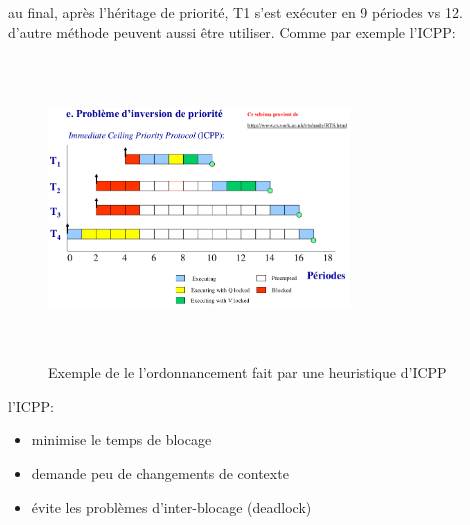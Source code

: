 \documentclass[oneside]{book}
\begin{document}
    au final, après l'héritage de priorité, T1 s'est exécuter en 9 périodes vs 12.\\
    
    d'autre méthode peuvent aussi être utiliser. Comme par exemple l'ICPP:\\
    
    \begin{figure}[!ht]
    	\centering
    	\includegraphics[width=8cm, height = 8cm, keepaspectratio]{Images/icpp.png}
    	\caption{Exemple de le l'ordonnancement fait par une heuristique d'ICPP}
    	\label{fig:ICPP}
    \end{figure}
    
    l'ICPP:\\
    \begin{itemize}
        \item minimise le temps de blocage
        \item demande peu de changements de contexte
        \item évite les problèmes d'inter-blocage (deadlock)
    \end{itemize}
    
    
    
    
\end{document}
